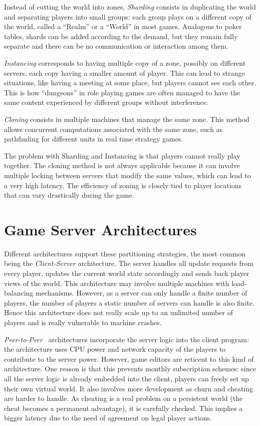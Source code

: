 \documentclass[conference]{IEEEtran}
\begin{document}
Instead of cutting the world into zones, \textit{Sharding} consists in duplicating the world and separating players into small groups: each group plays on a different copy of the world, called a ``Realm'' or a ``World'' in most games. Analogous to poker tables, shards can be added according to the demand, but they remain fully separate and there can be no communication or interaction among them.

\textit{Instancing} corresponds to having multiple copy of a zone, possibly on different servers, each copy having a smaller amount of player. This can lead to strange situations, like having a meeting at some place, but players cannot see each other. This is how ``dungeons'' in role playing games are often managed to have the same content experienced by different groups without interference.

\textit{Cloning} consists in multiple machines that manage the same zone. This method allows concurrent computations associated with the same zone, such as pathfinding for different units in real time strategy games.

The problem with Sharding and Instancing is that players cannot really play together. The cloning method is not always applicable because it can involve multiple locking between servers that modify the same values, which can lead to a very high latency. The efficiency of zoning is closely tied to player locations that can vary drastically during the game.


\section{Game Server Architectures}

Different architectures support these partitioning strategies, the most common being the \textit{Client-Server} architecture. The server handles all update requests from every player, updates the current world state accordingly and sends back player views of the world. This architecture may involve multiple machines with load-balancing mechanisms. However, as a server can only handle a finite number of players, the number of players a static number of servers can handle is also finite. Hence this architecture does not really scale up to an unlimited number of players and is really vulnerable to machine crashes.

\textit{Peer-to-Peer}~\cite{solipsis, voronet} architectures incorporate the server logic into the client program: the architecture uses CPU power and network capacity of the players to contribute to the server power. However, game editors are reticent to this kind of architecture. One reason is that this prevents monthly subscription schemes: since all the server logic is already embedded into the client, players can freely set up their own virtual world. It also involves more development as churn and cheating are harder to handle. As cheating is a real problem on a persistent world (the cheat becomes a permanent advantage), it is carefully checked. This implies a bigger latency due to the need of agreement on legal player actions.
\end{document}
